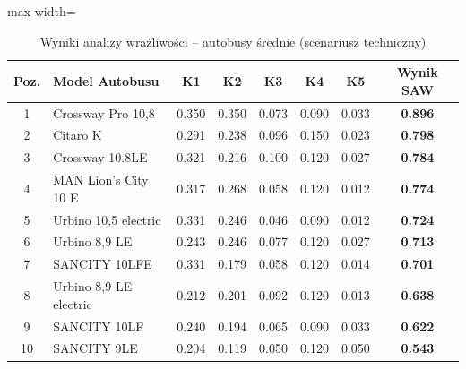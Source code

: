 \begin{table}[H]
    \centering
    \caption{Wyniki analizy wrażliwości -- autobusy średnie (scenariusz techniczny)}
    \vspace{0.2cm}
    \begin{adjustbox}{max width=\textwidth}
    \begin{tabular}{|c|l|c|c|c|c|c|c|}
        \hline
        \textbf{Poz.} & \textbf{Model Autobusu} & \textbf{K1} & \textbf{K2} & \textbf{K3} & \textbf{K4} & \textbf{K5} & \textbf{Wynik SAW} \\ \hline
        1 & Crossway Pro 10,8      & 0.350 & 0.350 & 0.073 & 0.090 & 0.033 & \textbf{0.896} \\ \hline
        2 & Citaro K               & 0.291 & 0.238 & 0.096 & 0.150 & 0.023 & \textbf{0.798} \\ \hline
        3 & Crossway 10.8LE        & 0.321 & 0.216 & 0.100 & 0.120 & 0.027 & \textbf{0.784} \\ \hline
        4 & MAN Lion's City 10 E   & 0.317 & 0.268 & 0.058 & 0.120 & 0.012 & \textbf{0.774} \\ \hline
        5 & Urbino 10,5 electric   & 0.331 & 0.246 & 0.046 & 0.090 & 0.012 & \textbf{0.724} \\ \hline
        6 & Urbino 8,9 LE          & 0.243 & 0.246 & 0.077 & 0.120 & 0.027 & \textbf{0.713} \\ \hline
        7 & SANCITY 10LFE          & 0.331 & 0.179 & 0.058 & 0.120 & 0.014 & \textbf{0.701} \\ \hline
        8 & Urbino 8,9 LE electric & 0.212 & 0.201 & 0.092 & 0.120 & 0.013 & \textbf{0.638} \\ \hline
        9 & SANCITY 10LF           & 0.240 & 0.194 & 0.065 & 0.090 & 0.033 & \textbf{0.622} \\ \hline
        10 & SANCITY 9LE           & 0.204 & 0.119 & 0.050 & 0.120 & 0.050 & \textbf{0.543} \\ \hline
    \end{tabular}
    \end{adjustbox}
\end{table}

